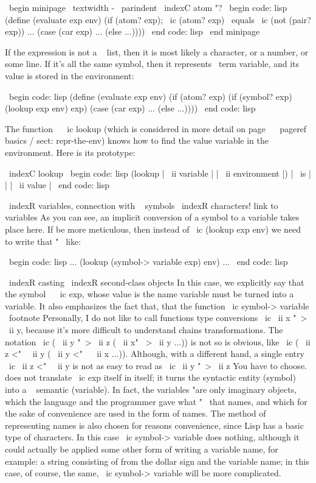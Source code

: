 \ begin {minipage} { \ textwidth - \ parindent }
\ indexC {atom "?}
\ begin {code: lisp}
(define (evaluate exp env)
  (if (atom? exp); \ ic {(atom? exp)} { \ equals } \ ic {(not (pair? exp))}
      ...
      (case (car exp)
        ...
        (else ...))))
\ end {code: lisp}
\ end {minipage}

If the expression is not a ~ list, then it is most likely a character, or a number, or
some line. If it's all the same symbol, then it represents
\ term {variable}, and its value is stored in the environment:

\ begin {code: lisp}
(define (evaluate exp env)
  (if (atom? exp)
      (if (symbol? exp) (lookup exp env) exp)
      (case (car exp)
        ...
        (else ...))))
\ end {code: lisp}

The function ~ \ ic {lookup} (which is considered in more detail on
page ~ \ pageref {basics / sect: repr-the-env}) knows how to find the value
variable in the environment. Here is its prototype:

\ indexC {lookup}
\ begin {code: lisp}
(lookup | \ ii {variable} | | \ ii {environment} |) | \ is | | | \ ii {value} |
\ end {code: lisp}

\ indexR {variables, connection with ~ symbols}
\ indexR {characters! link to ~ variables}
As you can see, an implicit conversion of a symbol to a variable takes place here. If
be more meticulous, then instead of \ ic {(lookup exp env)} we need to write that "~
like:

\ begin {code: lisp}
... (lookup (symbol-> variable exp) env) ...
\ end {code: lisp}

\ indexR {casting}
\ indexR {second-class objects}
In this case, we explicitly say that the symbol ~ \ ic {exp}, whose value is the name
variable must be turned into a ~ variable. It also emphasizes the fact that,
that the function \ ic {symbol-> variable} \ footnote {Personally, I do not like to call functions
type conversions \ ic { \ ii {x} "~> \ ii {y}}, because it's more difficult to understand chains
transformations. The notation \ ic {( \ ii {y} "~> \ ii {z} ( \ ii {x}" ~> \ ii {y} ...))} is not so
is obvious, like \ ic {( \ ii {z} <"~ \ ii {y} ( \ ii {y} <" ~ \ ii {x} ...))}. Although, with a different
hand, a single entry \ ic { \ ii {z} <"~ \ ii {y}} is not as easy to read as
\ ic { \ ii {y} "~> \ ii {z}} You have to choose.} does not translate \ ic {exp} itself
in itself; it turns the syntactic entity (symbol) into a ~ semantic
(variable). In fact, the variables "are only imaginary objects,
which the language and the programmer gave what "~ that names, and which for the sake of convenience
are used in the form of names. The method of representing names is also chosen for reasons
convenience, since Lisp has a basic type of characters. In this case
\ ic {symbol-> variable} does nothing, although it could actually be applied
some other form of writing a variable name, for example: a string consisting of
from the dollar sign and the variable name; in this case, of course, the same,
\ ic {symbol-> variable} will be more complicated.

